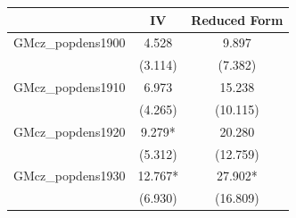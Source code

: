  \begin{tabular}{l*{2}{c}} \toprule
                &\multicolumn{1}{c}{IV}&\multicolumn{1}{c}{Reduced Form}\\
\midrule
GMcz\_popdens1900&    4.528   &    9.897   \\
                &  (3.114)   &  (7.382)   \\
\addlinespace
GMcz\_popdens1910&    6.973   &   15.238   \\
                &  (4.265)   & (10.115)   \\
\addlinespace
GMcz\_popdens1920&    9.279*  &   20.280   \\
                &  (5.312)   & (12.759)   \\
\addlinespace
GMcz\_popdens1930&   12.767*  &   27.902*  \\
                &  (6.930)   & (16.809)   \\
 \bottomrule \end{tabular}
